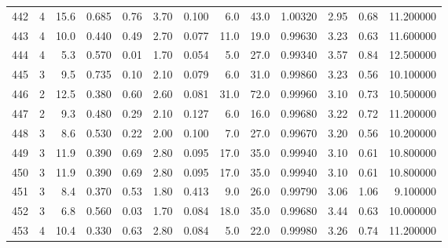 \begin{tabular}{lrrrrrrrrrrrr}
442  &        4 &           15.6 &             0.685 &         0.76 &            3.70 &      0.100 &                  6.0 &                  43.0 &  1.00320 &  2.95 &       0.68 &  11.200000 \\
443  &        4 &           10.0 &             0.440 &         0.49 &            2.70 &      0.077 &                 11.0 &                  19.0 &  0.99630 &  3.23 &       0.63 &  11.600000 \\
444  &        4 &            5.3 &             0.570 &         0.01 &            1.70 &      0.054 &                  5.0 &                  27.0 &  0.99340 &  3.57 &       0.84 &  12.500000 \\
445  &        3 &            9.5 &             0.735 &         0.10 &            2.10 &      0.079 &                  6.0 &                  31.0 &  0.99860 &  3.23 &       0.56 &  10.100000 \\
446  &        2 &           12.5 &             0.380 &         0.60 &            2.60 &      0.081 &                 31.0 &                  72.0 &  0.99960 &  3.10 &       0.73 &  10.500000 \\
447  &        2 &            9.3 &             0.480 &         0.29 &            2.10 &      0.127 &                  6.0 &                  16.0 &  0.99680 &  3.22 &       0.72 &  11.200000 \\
448  &        3 &            8.6 &             0.530 &         0.22 &            2.00 &      0.100 &                  7.0 &                  27.0 &  0.99670 &  3.20 &       0.56 &  10.200000 \\
449  &        3 &           11.9 &             0.390 &         0.69 &            2.80 &      0.095 &                 17.0 &                  35.0 &  0.99940 &  3.10 &       0.61 &  10.800000 \\
450  &        3 &           11.9 &             0.390 &         0.69 &            2.80 &      0.095 &                 17.0 &                  35.0 &  0.99940 &  3.10 &       0.61 &  10.800000 \\
451  &        3 &            8.4 &             0.370 &         0.53 &            1.80 &      0.413 &                  9.0 &                  26.0 &  0.99790 &  3.06 &       1.06 &   9.100000 \\
452  &        3 &            6.8 &             0.560 &         0.03 &            1.70 &      0.084 &                 18.0 &                  35.0 &  0.99680 &  3.44 &       0.63 &  10.000000 \\
453  &        4 &           10.4 &             0.330 &         0.63 &            2.80 &      0.084 &                  5.0 &                  22.0 &  0.99980 &  3.26 &       0.74 &  11.200000 \\

\end{tabular}
